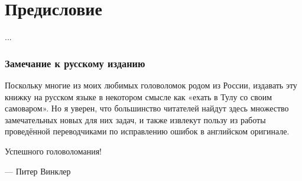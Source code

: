 \chapter*{Предисловие}
...




\subsection*{Замечание к русскому изданию}

Поскольку многие из моих любимых головоломок родом из России, издавать эту книжку на русском языке в некотором смысле как «ехать в Тулу со своим самоваром».
Но я уверен, что большинство читателей найдут здесь множество замечательных новых для них задач, и также извлекут пользу из работы проведённой переводчиками по исправлению ошибок в английском оригинале.

Успешного головоломания!

--- Питер Винклер
